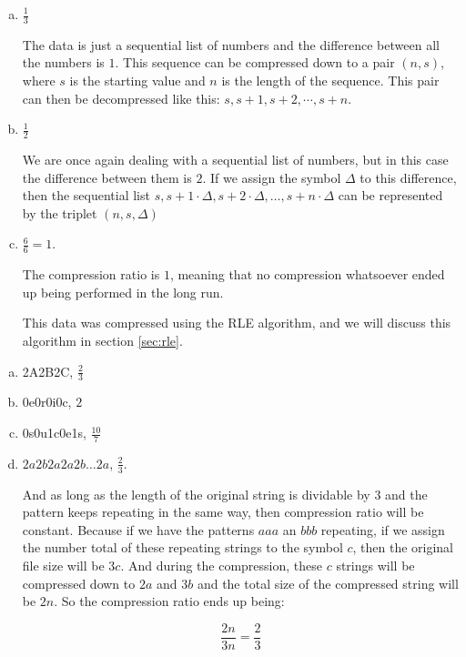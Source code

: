 \begin{Answer}[ref={compression-ratio}]

  \begin{enumerate}[(a)]
  \item $\frac{1}{3}$

    The data is just a sequential list of numbers and the difference
    between all the numbers is $1$. This sequence can be compressed
    down to a pair $(n,s)$, where $s$ is the starting value and $n$ is
    the length of the sequence. This pair can then be decompressed
    like this: $s,s+1,s+2,\cdots,s+n$.


  \item $\frac{1}{2}$

    We are once again dealing with a sequential list of numbers, but
    in this case the difference between them is $2$. If we assign the
    symbol $\Delta$ to this difference, then the sequential list $s, s
    + 1 \cdot \Delta, s + 2 \cdot \Delta, \dots, s + n \cdot \Delta$
    can be represented by the triplet $(n,s,\Delta)$

  \item $\frac{6}{6} = 1$.

    The compression ratio is $1$, meaning that no compression
    whatsoever ended up being performed in the long run.

    This data was compressed using the RLE algorithm, and we will
    discuss this algorithm in section \ref{sec:rle}.

  \end{enumerate}
\end{Answer}

\begin{Answer}[ref={rle-compression}]

  \begin{enumerate}[(a)]
  \item 2A2B2C, $\frac{2}{3}$
  \item 0e0r0i0c, $2$
  \item 0s0u1c0e1s, $\frac{10}{7}$
  \item $2a2b2a2a2b\dots 2a$, $\frac{2}{3}$.

    And as long as the length of the original string is dividable by
    $3$ and the pattern keeps repeating in the same way, then
    compression ratio will be constant. Because if we have the
    patterns $aaa$ an $bbb$ repeating, if we assign the number total
    of these repeating strings to the symbol $c$, then the original
    file size will be $3c$. And during the compression, these $c$
    strings will be compressed down to $2a$ and $3b$ and the total
    size of the compressed string will be $2n$. So the compression
    ratio ends up being:

    \begin{equation*}
      \frac{2n}{3n} = \frac{2}{3}
    \end{equation*}

  \end{enumerate}

\end{Answer}

